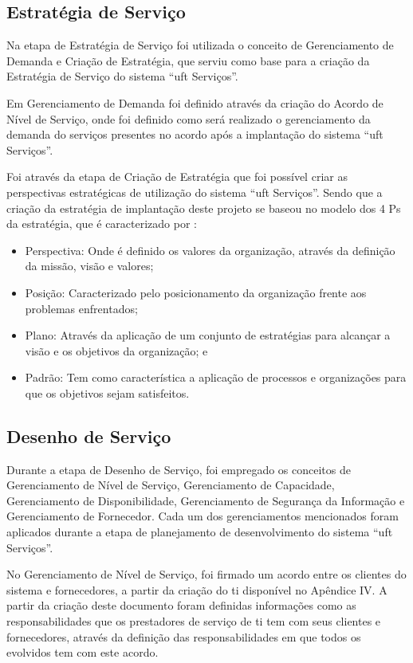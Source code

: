\subsection*{Estratégia de Serviço}

\noindent Na etapa de Estratégia de Serviço foi utilizada o conceito de Gerenciamento de Demanda e Criação de Estratégia, que serviu como base para a criação da Estratégia de Serviço do sistema ``\acrshort{uft} Serviços''.

Em Gerenciamento de Demanda foi definido através da criação do Acordo de Nível de Serviço, onde foi definido como será realizado o gerenciamento da demanda do serviços presentes no acordo após a implantação do sistema ``\acrshort{uft} Serviços''.

Foi através da etapa de Criação de Estratégia que foi possível criar as perspectivas estratégicas de utilização do sistema ``\acrshort{uft} Serviços''. Sendo que a criação da estratégia de implantação deste projeto se baseou no modelo dos 4 Ps da estratégia, que é caracterizado por \cite{servicestrategy}:

\begin{itemize}
    \item Perspectiva: Onde é definido os valores da organização, através da definição da missão, visão e valores;
    \item Posição: Caracterizado pelo posicionamento da organização frente aos problemas enfrentados;
    \item Plano: Através da aplicação de um conjunto de estratégias para alcançar a visão e os objetivos da organização; e
    \item Padrão: Tem como característica a aplicação de processos e organizações para que os objetivos sejam satisfeitos.
\end{itemize}

\subsection*{Desenho de Serviço}

\noindent Durante a etapa de Desenho de Serviço, foi empregado os conceitos de Gerenciamento de Nível de Serviço, Gerenciamento de Capacidade, Gerenciamento de Disponibilidade, Gerenciamento de Segurança da Informação e Gerenciamento de Fornecedor. Cada um dos gerenciamentos mencionados foram aplicados durante a etapa de planejamento de desenvolvimento do sistema ``\acrshort{uft} Serviços''.

No Gerenciamento de Nível de Serviço, foi firmado um acordo entre os clientes do sistema e fornecedores, a partir da criação do \acrshort{ti} disponível no Apêndice IV. A partir da criação deste documento foram definidas informações como as responsabilidades que os prestadores de serviço de \acrshort{ti} tem com seus clientes e fornecedores, através da definição das responsabilidades em que todos os evolvidos tem com este acordo.

